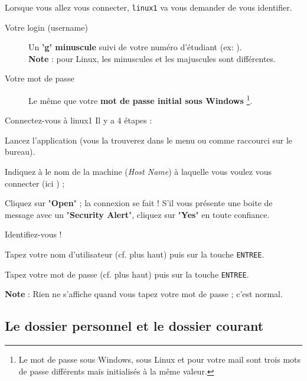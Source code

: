 \documentclass[a4paper,11pt]{style-esi/td}
\begin{document}
		\bigskip
		Lorsque vous allez vous connecter, \verb_linux1_ va vous demander de vous identifier.

		\begin{infobox}
			\begin{description}
			\item[Votre login (username)]
				Un \textbf{'g' minuscule} suivi de votre numéro d'étudiant
				(ex: ).
				\\\textbf{Note} : pour Linux, les minuscules et les majuscules 
				sont différentes.
			\item[Votre mot de passe]
				Le même que votre \textbf{mot de passe initial sous Windows}%
				\footnote{%
					Le mot de passe sous Windows,
					sous Linux et pour votre mail  
					sont trois mots de passe différents
					mais initialisés à la même valeur.        
				}.			
			\end{description}
		\end{infobox}

		\begin{Tutoriel}{Connectez-vous à linux1} 
		Il y a 4 étapes :
		\begin{steps}			
		\item 
			Lancez l'application  
			(vous la trouverez dans le menu ou comme raccourci sur le bureau).			
		\item 
			Indiquez à  le nom de la machine (\textit{Host Name}) 
			à laquelle vous voulez vous connecter (ici ) ;
		\item 
			Cliquez sur "\textbf{Open}" ; 
			la connexion se fait ! 
			S'il vous présente une boite de message avec un "\textbf{Security Alert}", 
			cliquez sur "\textbf{Yes}" en toute confiance.			
		\item 
			Identifiez-vous !
			\begin{steps}
			\item 
				Tapez votre nom d'utilisateur (cf. plus haut) 
				puis sur la touche \verb_ENTREE_. 
			\item 
				Tapez votre mot de passe (cf. plus haut) puis sur la touche \verb_ENTREE_.
				\par
				\textbf{Note} : Rien ne s'affiche quand vous tapez votre mot de passe ; c'est normal.
			\end{steps}
		\end{steps}
		\end{Tutoriel}

\newpage
	\subsection{Le dossier personnel et le dossier courant}
\end{document}
